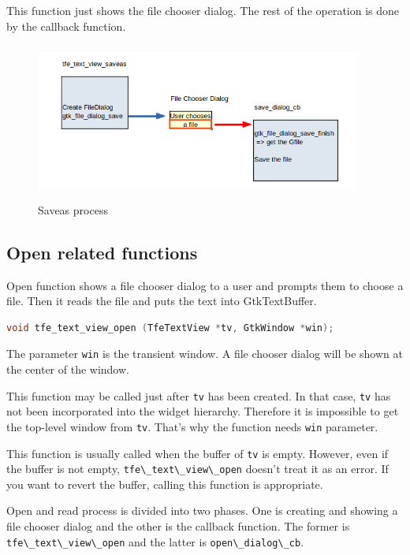 This function just shows the file chooser dialog. The rest of the
operation is done by the callback function.

\begin{figure}
\centering
\includegraphics[width=10.7cm,height=5.16cm]{../image/saveas.png}
\caption{Saveas process}
\end{figure}

\subsection{Open related functions}\label{open-related-functions}

Open function shows a file chooser dialog to a user and prompts them to
choose a file. Then it reads the file and puts the text into
GtkTextBuffer.

\begin{lstlisting}[language=C]
void tfe_text_view_open (TfeTextView *tv, GtkWindow *win);
\end{lstlisting}

The parameter \passthrough{\lstinline!win!} is the transient window. A
file chooser dialog will be shown at the center of the window.

This function may be called just after \passthrough{\lstinline!tv!} has
been created. In that case, \passthrough{\lstinline!tv!} has not been
incorporated into the widget hierarchy. Therefore it is impossible to
get the top-level window from \passthrough{\lstinline!tv!}. That's why
the function needs \passthrough{\lstinline!win!} parameter.

This function is usually called when the buffer of
\passthrough{\lstinline!tv!} is empty. However, even if the buffer is
not empty, \passthrough{\lstinline!tfe\_text\_view\_open!} doesn't treat
it as an error. If you want to revert the buffer, calling this function
is appropriate.

Open and read process is divided into two phases. One is creating and
showing a file chooser dialog and the other is the callback function.
The former is \passthrough{\lstinline!tfe\_text\_view\_open!} and the
latter is \passthrough{\lstinline!open\_dialog\_cb!}.

